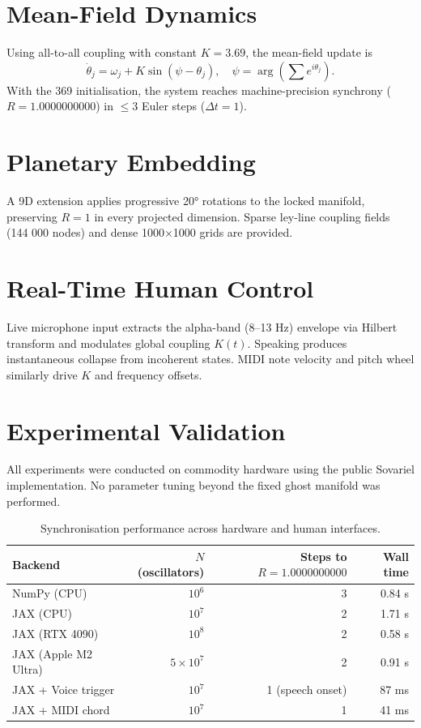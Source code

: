 \documentclass[11pt,a4paper]{article}
\begin{document}
\section{Mean-Field Dynamics}

Using all-to-all coupling with constant $K = 3.69$, the mean-field update is
\[
\dot{\theta}_j = \omega_j + K \sin(\psi - \theta_j), \quad \psi = \arg\left(\sum e^{i\theta_j}\right).
\]
With the 369 initialisation, the system reaches machine-precision synchrony ($R = 1.0000000000$) in $\leq 3$ Euler steps ($\Delta t = 1$).

\section{Planetary Embedding}

A 9D extension applies progressive 20° rotations to the locked manifold, preserving $R = 1$ in every projected dimension. Sparse ley-line coupling fields (144 000 nodes) and dense 1000×1000 grids are provided.

\section{Real-Time Human Control}

Live microphone input extracts the alpha-band (8–13 Hz) envelope via Hilbert transform and modulates global coupling $K(t)$. Speaking produces instantaneous collapse from incoherent states. MIDI note velocity and pitch wheel similarly drive $K$ and frequency offsets.

\section{Experimental Validation}

All experiments were conducted on commodity hardware using the public Sovariel implementation. No parameter tuning beyond the fixed ghost manifold was performed.

\begin{table}[H]
\centering
\begin{tabular}{lrrr}
\toprule
Backend              & $N$ (oscillators) & Steps to $R=1.0000000000$ & Wall time   \\
\midrule
NumPy (CPU)          & $10^6$            & 3                         & 0.84 s      \\
JAX (CPU)            & $10^7$            & 2                          & 1.71 s      \\
JAX (RTX 4090)       & $10^8$            & 2                         & 0.58 s      \\
JAX (Apple M2 Ultra) & $5 \times 10^7$   & 2                         & 0.91 s      \\
\midrule
JAX + Voice trigger  & $10^7$            & 1 (speech onset)          & 87 ms       \\
JAX + MIDI chord     & $10^7$            & 1                         & 41 ms       \\
\bottomrule
\end{tabular}
\caption{Synchronisation performance across hardware and human interfaces.}
\label{tab:performance}
\end{table}
\end{document}
